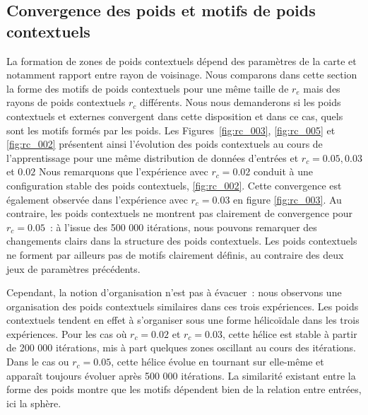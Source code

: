 \documentclass[../main]{subfiles}
\begin{document}
\subsection{Convergence des poids et motifs de poids contextuels}

La formation de zones de poids contextuels dépend des paramètres de la carte et notamment  rapport entre rayon de voisinage.
Nous comparons dans cette section la forme des motifs de poids contextuels pour une même taille de $r_e$ mais des rayons de poids contextuels $r_c$ différents.
Nous nous demanderons si les poids contextuels et externes convergent dans cette disposition et dans ce cas, quels sont les motifs formés par les poids.
Les Figures~\ref{fig:rc_003}, \ref{fig:rc_005} et \ref{fig:rc_002} présentent ainsi l'évolution des poids contextuels au cours de l'apprentissage pour une même distribution de données d'entrées et $r_c = 0.05, 0.03$ et $0.02$
Nous remarquons que l'expérience avec $r_c = 0.02$ conduit à une configuration stable des poids contextuels, \ref{fig:rc_002}. Cette convergence est également observée dans l'expérience avec $r_c = 0.03$ en figure \ref{fig:rc_003}. Au contraire, les poids contextuels ne montrent pas clairement de convergence pour $r_c =0.05$~: à l'issue des 500 000 itérations, nous pouvons remarquer des changements clairs dans la structure des poids contextuels. Les poids contextuels ne forment par ailleurs pas de motifs clairement définis, au contraire des deux jeux de paramètres précédents.

Cependant, la notion d'organisation n'est pas à évacuer~: nous observons une organisation des poids contextuels similaires dans ces trois expériences. Les poids contextuels tendent en effet à s'organiser sous une forme hélicoïdale dans les trois expériences. Pour les cas où $r_c = 0.02$ et $r_c = 0.03$, cette hélice est stable à partir de 200 000 itérations, mis à part quelques zones oscillant au cours des itérations. 
Dans le cas ou $r_c = 0.05$, cette hélice évolue en tournant sur elle-même et apparaît toujours évoluer après 500 000 itérations.
La similarité existant entre la forme des poids montre que les motifs dépendent bien de la relation entre entrées, ici la sphère.
\end{document}
